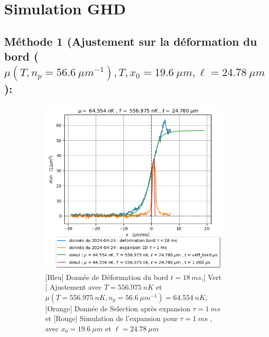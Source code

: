 \documentclass[a3, 10pt,twoside]{article}          %
\theoremstyle{plain}
\theoremstyle{definition}
\theoremstyle{remark}
\theoremstyle{definition} %
\begin{document}
	\section{Simulation GHD}

	
		\subsection{Méthode 1 (Ajustement sur la déformation du bord ($\mu( T , n_p = 56.6 ~{\mu m}^{-1} ) , T , x_0 = 19.6 ~\mu m  , \ell = 24.78 ~ \mu m  $ ): } 
		
		
		
		\begin{figure}[!ht]
			\begin{subfigure}[b]{0.45\textwidth}
        		\centering
        		\includegraphics[width=\textwidth]{Figures/simul_deformation_18_24-04-2024}
        		\caption{{\color{blue} [Bleu] Donnée de Déformation du bord $t= 18 ~ms$},{\color{OliveGreen}[ Vert ]  Ajustement avec $T = 556.975 ~nK$ et $\mu ( T =556.975 ~nK  , n_p = 56.6 ~{\mu m}^{-1} )= 64.554~nK$}, {\color{orange}[Orange] Donnée de Selection après expansion $\tau = 1~ms$} et {\color{red}[Rouge] Simulation de l'expansion pour $\tau= 1~ms$  , avec $x_0 = 19.6~\mu m$ et $\ell = 24.78~\mu m$ }  }
        		\label{fig:ajustementdeform}
    		\end{subfigure}
    		\hfill
    		\begin{subfigure}[b]{0.45\textwidth}

\end{subfigure}
\end{figure}
\end{document}
